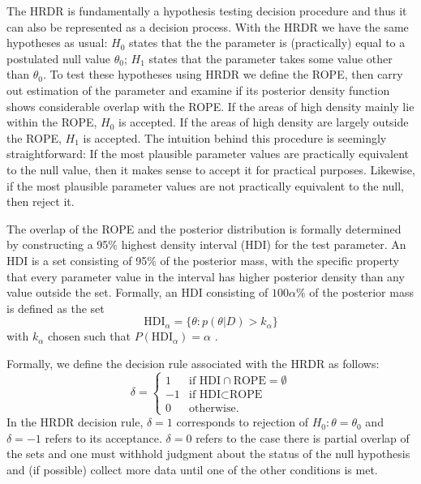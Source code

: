 \documentclass[9pt,twocolumn,twoside]{cidlab-draft}\templatetype{cidlab-invited}
\newcommand{\hdr}{HRDR}
\newcommand{\HDI}{\text{HDI}}
\begin{document}
The \hdr{} is fundamentally a hypothesis testing decision procedure and thus it can also be represented as a decision process. With the \hdr{} we have the same hypotheses as usual: $H_0$ states that the the parameter is (practically) equal to a postulated null value $\theta_0$; $H_1$ states that the parameter takes some value other than $\theta_0$. To test these hypotheses using \hdr{} we define the ROPE, then carry out estimation of the parameter and examine if its posterior density function shows considerable overlap with the ROPE. If the areas of high density mainly lie within the ROPE, $H_0$ is accepted. If the areas of high density are largely outside the ROPE, $H_1$ is accepted. The intuition behind this procedure is seemingly straightforward: If the most plausible parameter values are practically equivalent to the null value, then it makes sense to accept it for practical purposes. Likewise, if the most plausible parameter values are not practically equivalent to the null, then reject it.

The overlap of the ROPE and the posterior distribution is formally determined by constructing a 95\% highest density interval (HDI) for the test parameter. An HDI is a set consisting of 95\% of the posterior mass, with the specific property that every parameter value in the interval has higher posterior density than any value outside the set. Formally, an HDI consisting of $100\alpha\%$ of the posterior mass is defined as the set  
\begin{equation}
    \HDI_\alpha = \{\theta:p(\theta|D)>k_\alpha\}\label{eq:hdi}
\end{equation}
with $k_\alpha$ chosen such that $P\left(\HDI_\alpha\right)=\alpha$ \cite{druilhet2007}. 

Formally, we define the decision rule associated with the \hdr{} as follows:
\begin{equation*}
    \delta =
    \begin{cases}
    1 & \text{if HDI} \cap \text{ROPE} = \emptyset \\ %
    -1 & \text{if HDI} \subset \text{ROPE}\\
    0 & \text{otherwise}.
    \end{cases}
\end{equation*}
In the \hdr{} decision rule, $\delta=1$ corresponds to rejection of $H_0:\theta=\theta_0$ and $\delta=-1$ refers to its acceptance. $\delta=0$ refers to the case there is partial overlap of the sets and one must withhold judgment about the status of the null hypothesis and (if possible) collect more data until one of the other conditions is met.
\end{document}
